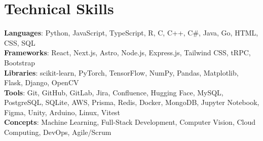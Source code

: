 \documentclass[letterpaper,11pt]{article}
\begin{document}
\section{Technical Skills}
 \begin{itemize}[leftmargin=0.15in, label={}]
    \small{\item{
     \textbf{Languages}{: Python, JavaScript, TypeScript, R, C, C++, C\#, Java, Go, HTML, CSS, SQL} \\
     \textbf{Frameworks}{: React, Next.js, Astro, Node.js, Express.js, Tailwind CSS, tRPC, Bootstrap} \\
     \textbf{Libraries}{: scikit-learn, PyTorch, TensorFlow, NumPy, Pandas, Matplotlib, Flask, Django, OpenCV} \\
     \textbf{Tools}{: Git, GitHub, GitLab, Jira, Confluence, Hugging Face, MySQL, PostgreSQL, SQLite, AWS, Prisma, Redis, Docker, MongoDB, Jupyter Notebook, Figma, Unity, Arduino, Linux, Vitest} \\
    \textbf{Concepts}{: Machine Learning, Full-Stack Development, Computer Vision,
    Cloud Computing, DevOps, Agile/Scrum} \\
    }}
 \end{itemize}

\end{document}
